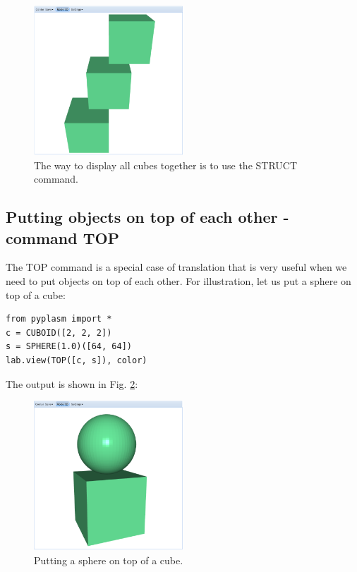 \documentclass[article,A4,12pt]{llncs}
\begin{document}
\begin{figure}[!ht]
\begin{center}
\includegraphics[width=0.5\textwidth]{img/comp-1.png}
\end{center}
\vspace{-2mm}
\caption{The way to display all cubes together is to use the STRUCT command.}
\label{fig:comp-1}
\end{figure}


\subsection{Putting objects on top of each other - command TOP}

The TOP command is a special case of translation that is very 
useful when we need to put objects on top of each other.
For illustration, let us put a sphere on top of a cube:

\begin{verbatim}
from pyplasm import *
c = CUBOID([2, 2, 2])
s = SPHERE(1.0)([64, 64])
lab.view(TOP([c, s]), color)
\end{verbatim}
The output is shown in Fig. \ref{fig:top-1}:

\newpage

\begin{figure}[!ht]
\begin{center}
\includegraphics[width=0.5\textwidth]{img/top-1.png}
\end{center}
\vspace{-2mm}
\caption{Putting a sphere on top of a cube.}
\label{fig:top-1}
\end{figure}
\end{document}
